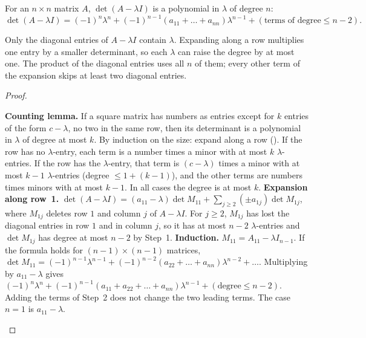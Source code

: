 \documentclass[10pt]{scrartcl}
\begin{document}
\begin{proposition*}
  For an $n\times n$ matrix $A$, $\det(A-\lambda I)$ is a polynomial in $\lambda$ of degree $n$:
  \[
    \det(A-\lambda I)=(-1)^n\lambda^n+(-1)^{n-1}(a_{11}+\dots+a_{nn})\lambda^{n-1}+(\text{terms of degree}\le n-2).
  \]
\end{proposition*}
\begin{ideabox}
  Only the diagonal entries of $A-\lambda I$ contain $\lambda$. Expanding along a row multiplies one entry by a smaller determinant, so each $\lambda$ can raise the degree by at most one. The product of the diagonal entries uses all $n$ of them; every other term of the expansion skips at least two diagonal entries.
\end{ideabox}
\begin{proof}
  \begin{steps}
    \ii \textbf{Counting lemma.} If a square matrix has numbers as entries except for $k$ entries of the form $c-\lambda$, no two in the same row, then its determinant is a polynomial in $\lambda$ of degree at most $k$. By induction on the size: expand along a row (). If the row has no $\lambda$-entry, each term is a number times a minor with at most $k$ $\lambda$-entries. If the row has the $\lambda$-entry, that term is $(c-\lambda)$ times a minor with at most $k-1$ $\lambda$-entries (degree $\le 1+(k-1)$), and the other terms are numbers times minors with at most $k-1$. In all cases the degree is at most $k$.
    \ii \textbf{Expansion along row~1.} $\det(A-\lambda I)=(a_{11}-\lambda)\det M_{11}+\sum_{j\ge2}(\pm a_{1j})\det M_{1j}$, where $M_{1j}$ deletes row $1$ and column $j$ of $A-\lambda I$. For $j\ge2$, $M_{1j}$ has lost the diagonal entries in row $1$ and in column $j$, so it has at most $n-2$ $\lambda$-entries and $\det M_{1j}$ has degree at most $n-2$ by Step~1.
    \ii \textbf{Induction.} $M_{11}=A_{11}-\lambda I_{n-1}$. If the formula holds for $(n-1)\times(n-1)$ matrices, $\det M_{11}=(-1)^{n-1}\lambda^{n-1}+(-1)^{n-2}(a_{22}+\dots+a_{nn})\lambda^{n-2}+\dots$. Multiplying by $a_{11}-\lambda$ gives $(-1)^n\lambda^n+(-1)^{n-1}(a_{11}+a_{22}+\dots+a_{nn})\lambda^{n-1}+(\text{degree}\le n-2)$. Adding the terms of Step~2 does not change the two leading terms. The case $n=1$ is $a_{11}-\lambda$.
  \end{steps}
\end{proof}
\end{document}
